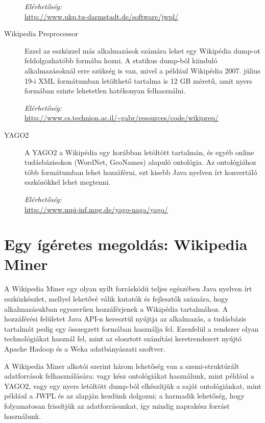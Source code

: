 \begin{description}
\textit{Elérhetőség:}\\
\url{http://www.ukp.tu-darmstadt.de/software/jwpl/}

\item[Wikipedia Preprocessor] Ezzel az eszközzel más alkalmazások számára lehet egy Wikipédia dump-ot feldolgozhatóbb formába hozni. A statikus dump-ból kiinduló alkalmazásoknál erre szükség is van, mivel a például Wikipédia 2007. július 19-i XML formátumban letölthető tartalma is 12 GB méretű, amit nyers formában szinte lehetetlen hatékonyan felhasználni.
	
\textit{Elérhetőség:}\\
\url{http://www.cs.technion.ac.il/~gabr/resources/code/wikiprep/}

\item[YAGO2\cite{yago2}] A YAGO2 a Wikipédia egy korábban letöltött tartalmán, és egyéb online tudásbázisokon (WordNet, GeoNames) alapuló ontológia. Az ontológiához több formátumban lehet hozzáférni, ezt kisebb Java nyelven írt konvertáló eszközökkel lehet megtenni.
	
\textit{Elérhetőség:}\\
\url{http://www.mpi-inf.mpg.de/yago-naga/yago/}
\end{description}

\section{Egy ígéretes megoldás: Wikipedia Miner}
\label{sec:wikipediaminer}

A Wikipedia Miner egy olyan nyílt forráskódú teljes egészében Java nyelven írt eszközkészlet, mellyel lehetővé válik kutatók és fejlesztők számára, hogy alkalmazásukban egyszerűen hozzáférjenek a Wikipédia tartalmához. A hozzáférési felületet Java API-n keresztül nyújtja az alkalmazás, a tudásbázis tartalmát pedig egy összegzett formában használja fel. Ezenfelül a rendszer olyan technológiákat használ fel, mint az elosztott számítási keretrendszert nyújtó Apache Hadoop és a Weka adatbányászati szoftver.

A Wikipedia Miner alkotói szerint három lehetőség van a szemi-struktúrált adatforrások felhasználására: vagy kész ontológiákat használunk, mint például a YAGO2, vagy egy nyers letöltött dump-ból elkészítjük a saját ontológiánkat, mint például a JWPL és az alapján kezdünk dolgozni; a harmadik lehetőség, hogy folyamatosan frissítjük az adatforrásunkat, így mindig naprakész forrást használunk.

